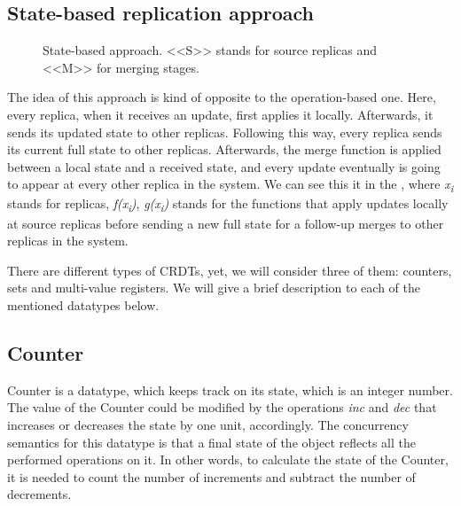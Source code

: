 
\subsection*{State-based replication approach}
\begin{figure}[!htb]
    \begin{center}
    \def\svgwidth{\linewidth}
    
    \caption {State-based approach\cite{2}. <<S>> stands for source replicas and <<M>> for merging stages.}
    \label{fig:theory2}
\end{center}
\end{figure}

The idea of this approach is kind of opposite to the operation-based one. Here, every replica, when it receives an update, first applies it locally. Afterwards, it sends its updated state to other replicas. Following this way, every replica sends its current full state to other replicas. Afterwards, the merge function is applied between a local state and a received state, and every update eventually is going to appear at every other replica in the system. We can see this it in the , where \textit{x\textsubscript{i}} stands for replicas, \textit{f(x\textsubscript{i})}, \textit{g(x\textsubscript{i})} stands for the functions that apply updates locally at source replicas before sending a new full state for a follow-up merges to other replicas in the system.


There are different types of CRDTs, yet, we will consider three of them: counters, sets and multi-value registers. We will give a brief description to each of the mentioned datatypes below.

\subsection*{Counter}

Counter is a datatype, which keeps track on its state, which is an integer number. The value of the Counter could be modified by the operations \textit{inc} and \textit{dec} that increases or decreases the state by one unit, accordingly\cite{3}. The concurrency semantics for this datatype is that a final state of the object reflects all the performed operations on it. In other words, to calculate the state of the Counter, it is needed to count the number of increments and subtract the number of decrements. 


